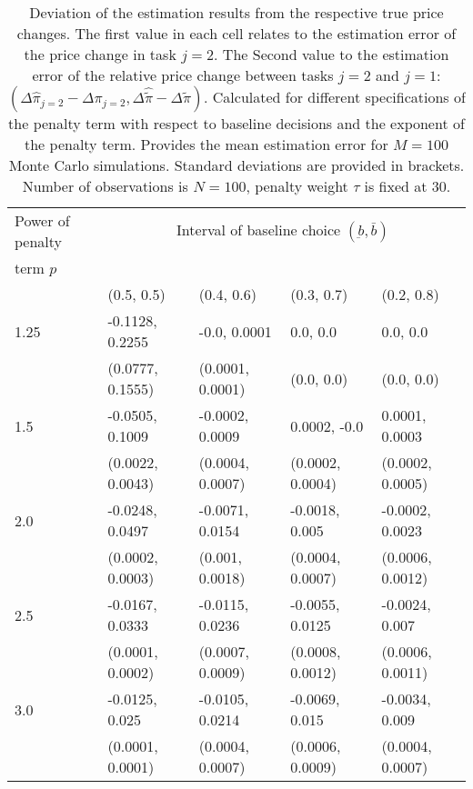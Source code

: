 \documentclass{article}
\newcommand\B{\rule[-1.5ex]{0pt}{0pt}}							%
\begin{document}
		\begin{table}
		\begin{tabular}{lllll}
		\toprule
		Power of penalty 	& \multicolumn{4}{c}{Interval of baseline choice $(\underbar{b}, \bar{b})$}						\\
		term $p$			&						&						&						&						\\				
		\cmidrule{2-5}
						  	&  (0.5, 0.5)			&  (0.4, 0.6)			&  (0.3, 0.7)			&  (0.2, 0.8)			\\
		\midrule										
		1.25				&  -0.1128, 0.2255		&  -0.0, 0.0001			&  0.0, 0.0				&  0.0, 0.0				\\ \B
					      	&  (0.0777, 0.1555)		&  (0.0001, 0.0001)		&  (0.0, 0.0)			&  (0.0, 0.0)			\\
		1.5					&  -0.0505, 0.1009		&  -0.0002, 0.0009		&  0.0002, -0.0			&  0.0001, 0.0003		\\ \B
						  	&  (0.0022, 0.0043)		&  (0.0004, 0.0007)		&  (0.0002, 0.0004)		&  (0.0002, 0.0005)		\\
		2.0					&  -0.0248, 0.0497		&  -0.0071, 0.0154		&  -0.0018, 0.005		&  -0.0002, 0.0023		\\ \B
						  	&  (0.0002, 0.0003)		&  (0.001, 0.0018)		&  (0.0004, 0.0007)		&  (0.0006, 0.0012)		\\
		2.5					&  -0.0167, 0.0333		&  -0.0115, 0.0236		&  -0.0055, 0.0125		&  -0.0024, 0.007		\\ \B
						 	&  (0.0001, 0.0002)		&  (0.0007, 0.0009)		&  (0.0008, 0.0012)		&  (0.0006, 0.0011)		\\
		3.0					&  -0.0125, 0.025		&  -0.0105, 0.0214		&  -0.0069, 0.015		&  -0.0034, 0.009		\\ \B
						  	&  (0.0001, 0.0001)		&  (0.0004, 0.0007)		&  (0.0006, 0.0009)		&  (0.0004, 0.0007)		\\
		\bottomrule

		\end{tabular}
		\caption{Deviation of the estimation results from the respective true price changes. The first value in each cell relates to the estimation error of the price change in task $j=2$. The Second value to the estimation error of the relative price change between tasks $j=2$ and $j=1$: $(\Delta \hat{\pi}_{j=2} - \Delta \pi_{j=2},  \Delta \hat{\tilde{\pi}} - \Delta \tilde{\pi})$. Calculated for different specifications of the penalty term with respect to baseline decisions and the exponent of the penalty term. Provides the mean estimation error for $M = 100$ Monte Carlo simulations. Standard deviations are provided in brackets. Number of observations is $N = 100$, penalty weight $\tau$ is fixed at 30.}
		\label{tab:est_rslt_differences_pp}
		\end{table}
\end{document}
